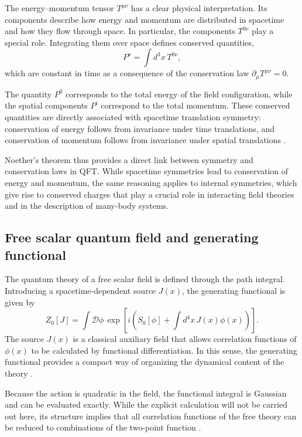 The energy--momentum tensor $T^{\mu\nu}$ has a clear physical interpretation.
Its components describe how energy and momentum are distributed in spacetime
and how they flow through space. In particular, the components $T^{0\nu}$ play a
special role. Integrating them over space defines conserved quantities,
\begin{equation}
P^\nu = \int d^3x \, T^{0\nu} ,
\end{equation}
which are constant in time as a consequence of the conservation law
$\partial_\mu T^{\mu\nu}=0$.

The quantity $P^0$ corresponds to the total energy of the field configuration,
while the spatial components $P^i$ correspond to the total momentum. These
conserved quantities are directly associated with spacetime translation
symmetry: conservation of energy follows from invariance under time
translations, and conservation of momentum follows from invariance under spatial
translations \cite{Pauli1941}.

Noether's theorem thus provides a direct link between symmetry and conservation
laws in QFT. While spacetime symmetries lead to conservation of
energy and momentum, the same reasoning applies to internal symmetries, which
give rise to conserved charges that play a crucial role in interacting field
theories and in the description of many-body systems.

\subsection*{Free scalar quantum field and generating functional}

The quantum theory of a free scalar field is defined through the path
integral. Introducing a spacetime-dependent source $J(x)$, the generating
functional is given by
\begin{equation}
Z_0[J] =
\int \mathcal{D}\phi\,
\exp\!\left[i\left(
S_0[\phi] + \int d^4x\, J(x)\phi(x)
\right)\right].
\end{equation}
The source $J(x)$ is a classical auxiliary field that allows correlation
functions of $\phi(x)$ to be calculated by functional differentiation. In this
sense, the generating functional provides a compact way of organizing the
dynamical content of the theory \cite{Schwinger1951,FeynmanHibbs1965}.

Because the action is quadratic in the field, the functional integral is
Gaussian and can be evaluated exactly. While the explicit calculation will not
be carried out here, its structure implies that all correlation functions of the
free theory can be reduced to combinations of the two-point function
\cite{Kachelriess2017}.

